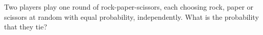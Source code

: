 Two players play one round of rock-paper-scissors, each choosing rock, paper or scissors at random with equal probability, independently. What is the probability that they tie?
